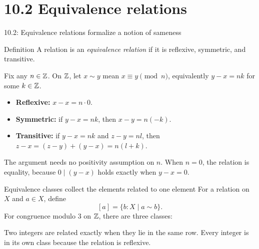 \section{10.2 Equivalence relations}
\begin{frame}{10.2: Equivalence relations formalize a notion of sameness}
\begin{block}{Definition}
A relation is an \emph{equivalence relation} if it is reflexive, symmetric, and transitive.
\end{block}
Fix any $n\in\mathbb{Z}$. On $\mathbb{Z}$, let $x\sim y$ mean $x\equiv y\pmod n$,
equivalently $y-x=nk$ for some $k\in\mathbb{Z}$.
\begin{itemize}
\item \textbf{Reflexive:} $x-x=n\cdot0$.
\item \textbf{Symmetric:} if $y-x=nk$, then $x-y=n(-k)$.
\item \textbf{Transitive:} if $y-x=nk$ and $z-y=nl$, then
$z-x=(z-y)+(y-x)=n(l+k)$.
\end{itemize}
The argument needs no positivity assumption on $n$. When $n=0$, the relation is equality,
because $0\mid(y-x)$ holds exactly when $y-x=0$.
\end{frame}

\begin{frame}{Equivalence classes collect the elements related to one element}
For a relation on $X$ and $a\in X$, define
\[
 [a]=\{b:X\mid a\sim b\}.
\]
For congruence modulo $3$ on $\mathbb{Z}$, there are three classes:
\begin{center}
\end{center}
Two integers are related exactly when they lie in the same row.
Every integer is in its own class because the relation is reflexive.
\end{frame}


